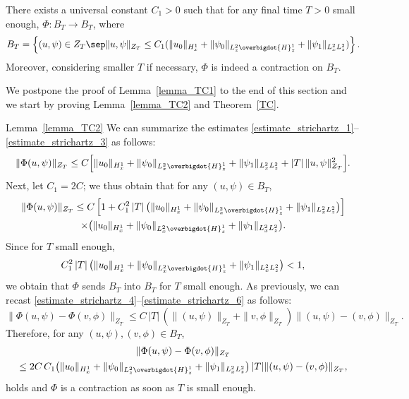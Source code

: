 \begin{lemma}\label{lemma_TC2}
There exists a universal constant $C_{1}>0$ such that for any final time $T>0$ small enough, $\Phi:B_{T}\to B_{T}$, where
\[
B_{T}=\left\{(u,\psi)\in Z_{T}\sep \|u,\psi\|_{Z_{T}}\leq C_{1}(\|u_{0}\|_{H_{x}^{1}}+\|\psi_{0}\|_{L_{z}^{2}\overbigdot{H}_{z}^{1}}+\|\psi_{1}\|_{L_{x}^{2}L_{z}^{2}})\right\}.
\]
Moreover, considering smaller $T$ if necessary, $\Phi$ is indeed a contraction on $B_{T}$.
\end{lemma}

We postpone the proof of Lemma~\ref{lemma_TC1} to the end of this section and we start by proving Lemma~\ref{lemma_TC2} and Theorem~\ref{TC}.

\begin{ProofOf}{Lemma~\ref{lemma_TC2}}
We can summarize the estimates \eqref{estimate_strichartz_1}--\eqref{estimate_strichartz_3} as follows:
\[
\|\Phi(u,\psi)\|_{Z_{T}}\leq C\Bigl[\|u_{0}\|_{H_{x}^{1}}+\|\psi_{0}\|_{L_{x}^{2}\overbigdot{H}_{z}^{1}}+\|\psi_{1}\|_{L_{x}^{2}L_{z}^{2}}+|T|\,\|u,\psi\|_{Z_{T}}^{2}\Bigr].
\]
Next, let $C_{1}=2C$; we thus obtain that for any $(u,\psi)\in B_{T}$,
\begin{multline*}
\|\Phi(u,\psi)\|_{Z_{T}}\leq C\left[1+C_{1}^{2}\,|T|\, \bigl(\|u_{0}\|_{H_{x}^{1}}+\|\psi_{0}\|_{L_{x}^{2}\overbigdot{H}_{z}^{1}}+\|\psi_{1}\|_{L_{x}^{2}L_{z}^{2}} \bigr)\right]\\
\times\bigl(\|u_{0}\|_{H_{x}^{1}}+\|\psi_{0}\|_{L_{x}^{2}\overbigdot{H}_{z}^{1}}+\|\psi_{1}\|_{L_{x}^{2}L_{z}^{2}}\bigr).
\end{multline*}
Since for $T$ small enough,
\[
C_{1}^{2}\,|T|\, \bigl(\|u_{0}\|_{H_{x}^{1}}+\|\psi_{0}\|_{L_{x}^{2}\overbigdot{H}_{z}^{1}}+\|\psi_{1}\|_{L_{x}^{2}L_{z}^{2}} \bigr)<1,
\]
we obtain that $\Phi$ sends $B_{T}$ into $B_{T}$ for $T$ small enough. As previously, we can recast \eqref{estimate_strichartz_4}--\eqref{estimate_strichartz_6} as follows:\vspace*{-3pt}
\[
\|\Phi(u,\psi)-\Phi(v,\phi)\|_{Z_{T}}\leq C\,|T|\,\left(\|(u,\psi)\|_{Z_{T}}+\|v,\phi\|_{Z_{T}}\right)\|(u,\psi)-(v,\phi)\|_{Z_{T}}.
\]
Therefore, for any $(u,\psi),(v,\phi)\in B_{T}$,\vspace*{-5pt}
\begin{multline*}
\|\Phi(u,\psi)-\Phi(v,\phi)\|_{Z_{T}}
\\
\leq 2C\,C_{1} \bigl(\|u_{0}\|_{H_{x}^{1}}+\|\psi_{0}\|_{L_{z}^{2}\overbigdot{H}_{z}^{1}}+\|\psi_{1}\|_{L_{x}^{2}L_{z}^{2}} \bigr)\,|T|\|(u,\psi)-(v,\phi)\|_{Z_{T}},
\end{multline*}
holds and $\Phi$ is a contraction as soon as $T$ is small enough.
\end{ProofOf}

